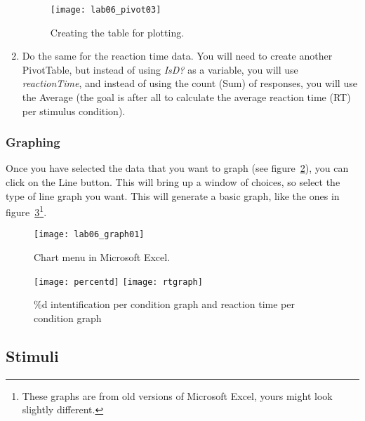 \documentclass{article}
\newcommand{\soft}[1]{\textsf{#1}}
\newcommand{\MSExcel}{\soft{Microsoft\texttrademark{} Excel}}
\begin{document}
\begin{enumerate}
\begin{figure}[!tbp]
\caption{Creating the table for plotting.}
\label{pivot3}
	\begin{center}
		\texttt{[image: lab06\_pivot03]}
	\end{center}
\end{figure}

\item Do the same for the reaction time data. You will need to create another PivotTable, but instead of using \emph{IsD?} as a variable, you will use \emph{reactionTime}, and instead of using the count (Sum) of responses, you will use the Average (the goal is after all to calculate the average reaction time (RT) per stimulus condition).

\end{enumerate}

\subsubsection{Graphing}

Once you have selected the data that you want to graph (see figure~\ref{graph01}), you can click on the Line button. This will bring up a window of choices, so select the type of line graph you want. This will generate a basic graph, like the ones in figure~\ref{dataplot}\footnote{These graphs are from old versions of \MSExcel{}, yours might look slightly different.}.

\begin{figure}[!tbp]
\caption{Chart menu in \MSExcel{}.}
\label{graph01}
	\begin{center}
		\texttt{[image: lab06\_graph01]}
	\end{center}
\end{figure}

\begin{figure}[!tbp]
\caption{\%d intentification per condition graph and reaction time per condition graph}
\label{dataplot}
	\begin{center}
		\texttt{[image: percentd]}
		\texttt{[image: rtgraph]}
	\end{center}
\end{figure}

\subsection{Stimuli}
\end{document}
